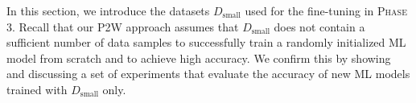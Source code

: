 \documentclass[letterpaper]{article}
\begin{document}
\begin{table}[!t]
\centering
\tiny

\caption{Summary of the small datasets $D_\text{small}$ utilized in \textsc{Phase 3} for fine-tuning.}
\label{tab:small_datasets}
\end{table}



In this section, we introduce the datasets $D_{\text{small}}$ used for the fine-tuning in \textsc{Phase 3}. Recall that our P2W approach assumes that $D_{\text{small}}$ does
not contain a sufficient number of data samples to successfully train a randomly initialized ML model from scratch and to achieve high accuracy. We confirm this by showing and discussing a set of experiments that evaluate the accuracy of new ML models trained with $D_{\text{small}}$ only.
\end{document}
